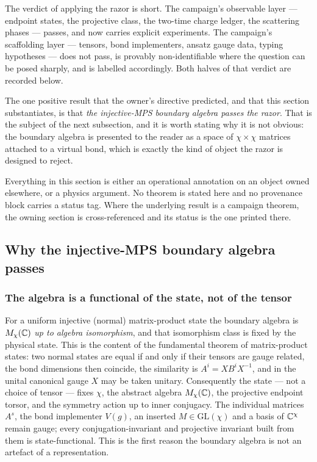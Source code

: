 The verdict of applying the razor is short. The campaign's observable layer
--- endpoint states, the projective class, the two-time charge ledger, the
scattering phases --- passes, and now carries explicit experiments. The
campaign's scaffolding layer --- tensors, bond implementers, ansatz gauge data,
typing hypotheses --- does not pass, is provably non-identifiable where the
question can be posed sharply, and is labelled accordingly. Both halves of
that verdict are recorded below.

The one positive result that the owner's directive predicted, and that this
section substantiates, is that \emph{the injective-MPS boundary algebra passes
the razor}. That is the subject of the next subsection, and it is worth
stating why it is not obvious: the boundary algebra is presented to the reader
as a space of $\chi\times\chi$ matrices attached to a virtual bond, which is
exactly the kind of object the razor is designed to reject.

\begin{remark}
\label{rem:op-register}
Everything in this section is either an operational annotation on an object
owned elsewhere, or a physics argument. No theorem is stated here and no
provenance block carries a status tag. Where the underlying result is a
campaign theorem, the owning section is cross-referenced and its status is the
one printed there.
\end{remark}

\subsection{Why the injective-MPS boundary algebra passes}
\label{sec:op-boundary-passes}

\subsubsection*{The algebra is a functional of the state, not of the tensor}

For a uniform injective (normal) matrix-product state the boundary algebra is
$M_\chi(\mathbb{C})$ \emph{up to algebra isomorphism}, and that isomorphism class is
fixed by the physical state. This is the content of the fundamental theorem of
matrix-product states: two normal states are equal if and only if their
tensors are gauge related, the bond dimensions then coincide, the similarity
is $A^i=XB^iX^{-1}$, and in the unital canonical gauge $X$ may be taken
unitary. Consequently the state --- not a choice of tensor --- fixes $\chi$,
the abstract algebra $M_\chi(\mathbb{C})$, the projective endpoint torsor, and the
symmetry action up to inner conjugacy. The individual matrices $A^s$, the bond
implementer $V(g)$, an inserted $M\in\mathrm{GL}(\chi)$ and a basis of
$\mathbb{C}^\chi$ remain gauge; every conjugation-invariant and projective invariant
built from them is state-functional. This is the first reason the boundary
algebra is not an artefact of a representation.

